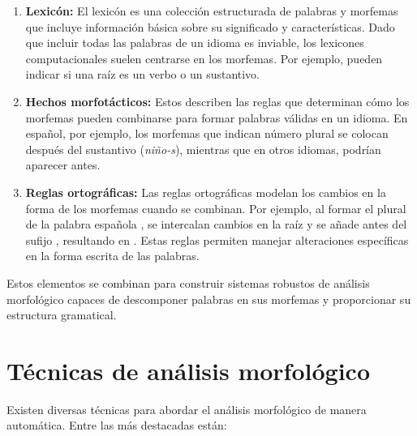 \documentclass{report}
\begin{document}
\begin{enumerate}
    \item \textbf{Lexicón:}
    El lexicón es una colección estructurada de palabras y morfemas que incluye información básica sobre su significado y características. Dado que incluir todas las palabras de un idioma es inviable, los lexicones computacionales suelen centrarse en los morfemas. Por ejemplo, pueden indicar si una raíz es un verbo o un sustantivo.
    
    \item \textbf{Hechos morfotácticos:}
    Estos describen las reglas que determinan cómo los morfemas pueden combinarse para formar palabras válidas en un idioma. En español, por ejemplo, los morfemas que indican número plural se colocan después del sustantivo (\textit{niño-s}), mientras que en otros idiomas, podrían aparecer antes.

    \item \textbf{Reglas ortográficas:}
    Las reglas ortográficas modelan los cambios en la forma de los morfemas cuando se combinan. Por ejemplo, al formar el plural de la palabra española , se intercalan cambios en la raíz y se añade  antes del sufijo , resultando en . Estas reglas permiten manejar alteraciones específicas en la forma escrita de las palabras.
\end{enumerate}
Estos elementos se combinan para construir sistemas robustos de análisis morfológico capaces de descomponer palabras en sus morfemas y proporcionar su estructura gramatical.

\section{Técnicas de análisis morfológico}
Existen diversas técnicas para abordar el análisis morfológico de manera automática. Entre las más destacadas están:
\end{document}
